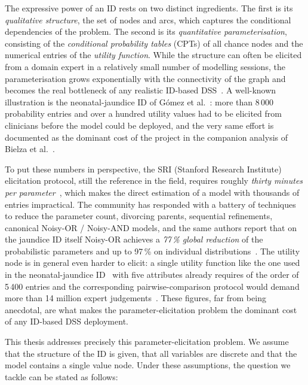 The expressive power of an ID rests on two distinct ingredients.
The first is its \emph{qualitative structure}, the set of nodes and
arcs, which captures the conditional dependencies of the problem.
The second is its \emph{quantitative parameterisation}, consisting of
the \emph{conditional probability tables} (CPTs) of all chance nodes and the
numerical entries of the \emph{utility function}. While the structure can
often be elicited from a domain expert in a relatively small number of
modelling sessions, the parameterisation grows exponentially with the
connectivity of the graph and becomes the real bottleneck of any
realistic ID-based DSS~\cite{bielza2010modeling}. A well-known
illustration is the neonatal-jaundice ID of G{\'o}mez et
al.~\cite{gomez2007jaundice}: more than 8\,000 probability entries
and over a hundred utility values had to be elicited from clinicians
before the model could be deployed, and the very same effort is
documented as the dominant cost of the project in the companion
analysis of Bielza et al.~\cite{bielza2000issues}.

To put these numbers in perspective, the SRI (Stanford Research Institute) elicitation
protocol, still the reference in the field, requires roughly \emph{thirty minutes per parameter}~\cite{bielza2010modeling},
which makes the direct estimation of a model with thousands of
entries impractical. The community has responded with a battery of
techniques to reduce the parameter count, divorcing parents,
sequential refinements, canonical Noisy-OR / Noisy-AND
models, and the same authors report that on the jaundice ID itself
Noisy-OR achieves a \emph{77\,\% global reduction} of the
probabilistic parameters and up to 97\,\% on individual
distributions~\cite{bielza2010modeling}. The utility node is in
general even harder to elicit: a single utility function like the one used in the neonatal-jaundice ID~\cite{gomez2007jaundice} with five
attributes already requires of the order of 5\,400 entries and the
corresponding pairwise-comparison protocol would demand more than
14 million expert judgements~\cite{bielza2010modeling}. These
figures, far from being anecdotal, are what makes the
parameter-elicitation problem the dominant cost of any ID-based
DSS deployment.

This thesis addresses precisely this parameter-elicitation problem.
We assume that the structure of the ID is given, that all variables
are discrete and that the model contains a single value node. Under
these assumptions, the question we tackle can be stated as follows:


